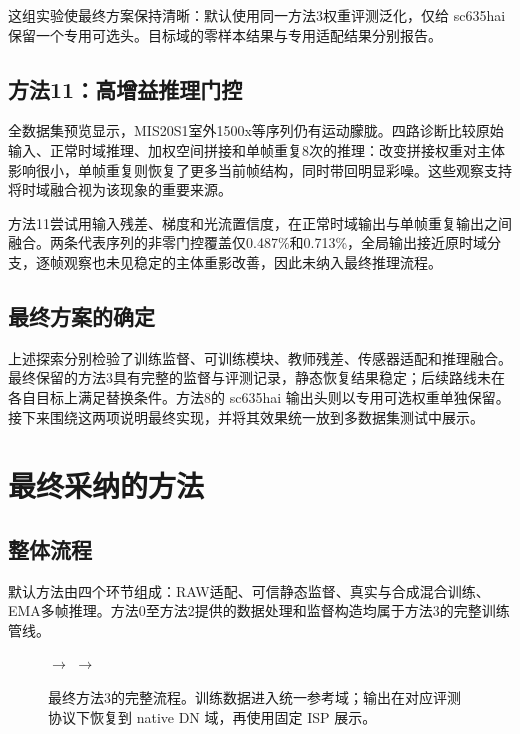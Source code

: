 \documentclass[11pt,a4paper,UTF8,fontset=fandol]{ctexart}
\begin{document}
这组实验使最终方案保持清晰：默认使用同一方法3权重评测泛化，仅给 sc635hai 保留一个专用可选头。目标域的零样本结果与专用适配结果分别报告。

\subsection{方法11：高增益推理门控}

全数据集预览显示，MIS20S1室外1500x等序列仍有运动朦胧。四路诊断比较原始输入、正常时域推理、加权空间拼接和单帧重复8次的推理：改变拼接权重对主体影响很小，单帧重复则恢复了更多当前帧结构，同时带回明显彩噪。这些观察支持将时域融合视为该现象的重要来源。

方法11尝试用输入残差、梯度和光流置信度，在正常时域输出与单帧重复输出之间融合。两条代表序列的非零门控覆盖仅0.487\%和0.713\%，全局输出接近原时域分支，逐帧观察也未见稳定的主体重影改善，因此未纳入最终推理流程。

\subsection{最终方案的确定}

上述探索分别检验了训练监督、可训练模块、教师残差、传感器适配和推理融合。最终保留的方法3具有完整的监督与评测记录，静态恢复结果稳定；后续路线未在各自目标上满足替换条件。方法8的 sc635hai 输出头则以专用可选权重单独保留。接下来围绕这两项说明最终实现，并将其效果统一放到多数据集测试中展示。

\section{最终采纳的方法}
\label{sec:adopted}

\subsection{整体流程}

默认方法由四个环节组成：RAW适配、可信静态监督、真实与合成混合训练、EMA多帧推理。方法0至方法2提供的数据处理和监督构造均属于方法3的完整训练管线。

\begin{figure}[H]
\centering\small
{}
$\longrightarrow$
$\longrightarrow$
\caption{最终方法3的完整流程。训练数据进入统一参考域；输出在对应评测协议下恢复到 native DN 域，再使用固定 ISP 展示。}
\label{fig:adopted_pipeline}
\end{figure}
\end{document}
